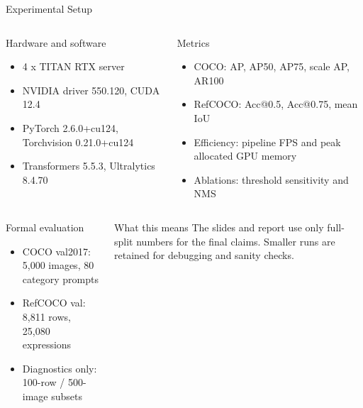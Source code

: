 \documentclass[aspectratio=169,professionalfonts]{beamer}
\begin{document}
\begin{frame}{Experimental Setup}
  \begin{columns}[T,onlytextwidth]
    \begin{block}{Hardware and software}
      \footnotesize
      \begin{itemize}
        \item 4 x TITAN RTX server
        \item NVIDIA driver 550.120, CUDA 12.4
        \item PyTorch 2.6.0+cu124, Torchvision 0.21.0+cu124
        \item Transformers 5.5.3, Ultralytics 8.4.70
      \end{itemize}
    \end{block}

    \begin{block}{Metrics}
      \footnotesize
      \begin{itemize}
        \item COCO: AP, AP50, AP75, scale AP, AR100
        \item RefCOCO: Acc@0.5, Acc@0.75, mean IoU
        \item Efficiency: pipeline FPS and peak allocated GPU memory
        \item Ablations: threshold sensitivity and NMS
      \end{itemize}
    \end{block}
  \end{columns}

  \vspace{0.35em}
  \begin{columns}[T,onlytextwidth]
    \begin{block}{Formal evaluation}
      \footnotesize
      \begin{itemize}
        \item COCO val2017: 5,000 images, 80 category prompts
        \item RefCOCO val: 8,811 rows, 25,080 expressions
        \item Diagnostics only: 100-row / 500-image subsets
      \end{itemize}
    \end{block}

    \begin{alertblock}{What this means}
      \footnotesize
      The slides and report use only full-split numbers for the final claims.
      Smaller runs are retained for debugging and sanity checks.
    \end{alertblock}
  \end{columns}
\end{frame}
\end{document}
